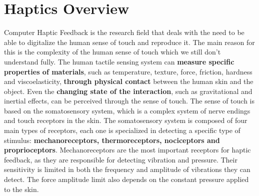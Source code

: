 \section{Haptics Overview}
Computer Haptic Feedback is the research field that deals with the need to be able to digitalize the human sense of touch and reproduce it.
The main reason for this is the complexity of the human sense of touch which we still don’t understand fully.
The human tactile sensing system can \textbf{measure specific properties of materials}, such as temperature, texture, force, friction, hardness and viscoelasticity, \textbf{through physical contact} between the human skin and the object.
Even the \textbf{changing state of the interaction}, such as gravitational and inertial effects, can be perceived through the sense of touch.
The sense of touch is based on the somatosensory system, which is a complex system of nerve endings and touch receptors in the skin. The somatosensory system is
composed of four main types of receptors, each one is specialized in detecting a specific type of stimulus: \textbf{mechanoreceptors, thermoreceptors, nociceptors and proprioceptors}.
Mechanoreceptors are the most important receptors for haptic feedback, as they are responsible for detecting vibration and pressure.
Their sensitivity is limited in both the frequency and amplitude of vibrations they can detect. The force amplitude limit also depends on the constant pressure applied to the skin.